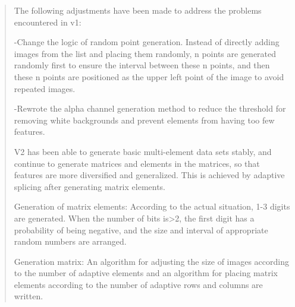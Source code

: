 \documentclass[
]{article}
\begin{document}
\begin{quote}
The following adjustments have been made to address the problems
encountered in v1:

-Change the logic of random point generation. Instead of directly adding
images from the list and placing them randomly, n points are generated
randomly first to ensure the interval between these n points, and then
these n points are positioned as the upper left point of the image to
avoid repeated images.

-Rewrote the alpha channel generation method to reduce the threshold for
removing white backgrounds and prevent elements from having too few
features.

V2 has been able to generate basic multi-element data sets stably, and
continue to generate matrices and elements in the matrices, so that
features are more diversified and generalized. This is achieved by
adaptive splicing after generating matrix elements.

Generation of matrix elements: According to the actual situation, 1-3
digits are generated. When the number of bits is\textgreater2, the first
digit has a probability of being negative, and the size and interval of
appropriate random numbers are arranged.

Generation matrix: An algorithm for adjusting the size of images
according to the number of adaptive elements and an algorithm for
placing matrix elements according to the number of adaptive rows and
columns are written.
\end{quote}
\end{document}
